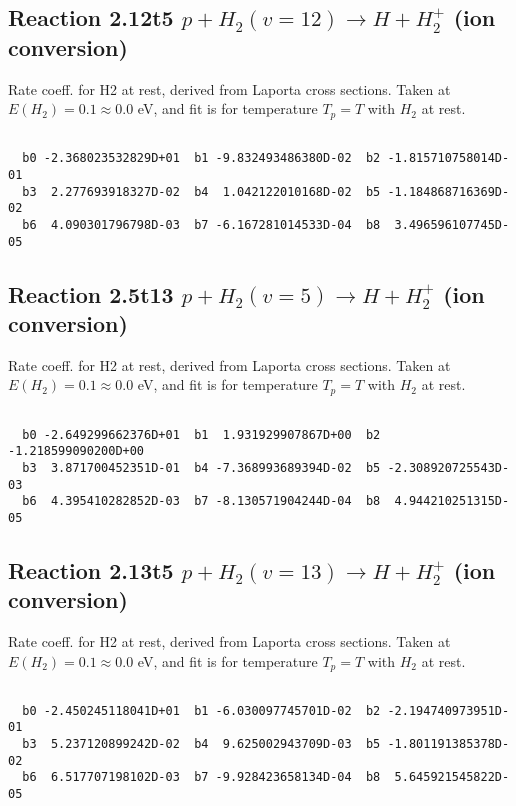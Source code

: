 \documentclass[12pt,dvipdfmx]{article}
\begin{document}
\newpage
\subsection{
Reaction 2.12t5
$ p + H_2(v=12) \rightarrow H + H_2^+$ (ion conversion)
}
Rate coeff. for H2 at rest, derived from Laporta cross sections.
Taken at $E(H_2) = 0.1 \approx 0.0$ eV,  and fit is for temperature $T_p=T$ with $H_2$ at rest.

\begin{small}\begin{verbatim}

  b0 -2.368023532829D+01  b1 -9.832493486380D-02  b2 -1.815710758014D-01
  b3  2.277693918327D-02  b4  1.042122010168D-02  b5 -1.184868716369D-02
  b6  4.090301796798D-03  b7 -6.167281014533D-04  b8  3.496596107745D-05

\end{verbatim}\end{small}

\newpage
\subsection{
Reaction 2.5t13
$ p + H_2(v=5) \rightarrow H + H_2^+$ (ion conversion)
}
Rate coeff. for H2 at rest, derived from Laporta cross sections.
Taken at $E(H_2) = 0.1 \approx 0.0$ eV,  and fit is for temperature $T_p=T$ with $H_2$ at rest.

\begin{small}\begin{verbatim}

  b0 -2.649299662376D+01  b1  1.931929907867D+00  b2 -1.218599090200D+00
  b3  3.871700452351D-01  b4 -7.368993689394D-02  b5 -2.308920725543D-03
  b6  4.395410282852D-03  b7 -8.130571904244D-04  b8  4.944210251315D-05

\end{verbatim}\end{small}

\newpage
\subsection{
Reaction 2.13t5
$ p + H_2(v=13) \rightarrow H + H_2^+$ (ion conversion)
}
Rate coeff. for H2 at rest, derived from Laporta cross sections.
Taken at $E(H_2) = 0.1 \approx 0.0$ eV,  and fit is for temperature $T_p=T$ with $H_2$ at rest.

\begin{small}\begin{verbatim}

  b0 -2.450245118041D+01  b1 -6.030097745701D-02  b2 -2.194740973951D-01
  b3  5.237120899242D-02  b4  9.625002943709D-03  b5 -1.801191385378D-02
  b6  6.517707198102D-03  b7 -9.928423658134D-04  b8  5.645921545822D-05

\end{verbatim}\end{small}
\end{document}
